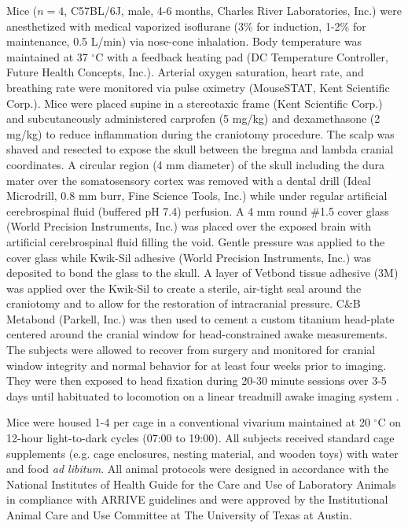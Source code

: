 \documentclass[review]{elsarticle}
\begin{document}
Mice ($n = 4$, C57BL/6J, male, 4-6 months, Charles River Laboratories, Inc.) were anesthetized with medical  vaporized isoflurane (3\% for induction, 1-2\% for maintenance, 0.5 L/min) via nose-cone inhalation. Body temperature was maintained at 37 $^\circ$C with a feedback heating pad (DC Temperature Controller, Future Health Concepts, Inc.). Arterial oxygen saturation, heart rate, and breathing rate were monitored via pulse oximetry (MouseSTAT, Kent Scientific Corp.). Mice were placed supine in a stereotaxic frame (Kent Scientific Corp.) and subcutaneously administered carprofen (5 mg/kg) and dexamethasone (2 mg/kg) to reduce inflammation during the craniotomy procedure. The scalp was shaved and resected to expose the skull between the bregma and lambda cranial coordinates. A circular region (4 mm diameter) of the skull including the dura mater over the somatosensory cortex was removed with a dental drill (Ideal Microdrill, 0.8 mm burr, Fine Science Tools, Inc.) while under regular artificial cerebrospinal fluid (buffered pH 7.4) perfusion. A 4 mm round \#1.5 cover glass (World Precision Instruments, Inc.) was placed over the exposed brain with artificial cerebrospinal fluid filling the void. Gentle pressure was applied to the cover glass while Kwik-Sil adhesive (World Precision Instruments, Inc.) was deposited to bond the glass to the skull. A layer of Vetbond tissue adhesive (3M) was applied over the Kwik-Sil to create a sterile, air-tight seal around the craniotomy and to allow for the restoration of intracranial pressure. C\&B Metabond (Parkell, Inc.) was then used to cement a custom titanium head-plate centered around the cranial window for head-constrained awake measurements. The subjects were allowed to recover from surgery and monitored for cranial window integrity and normal behavior for at least four weeks prior to imaging. They were then exposed to head fixation during 20-30 minute sessions over 3-5 days until habituated to locomotion on a linear treadmill awake imaging system \cite{He:2020}.

Mice were housed 1-4 per cage in a conventional vivarium maintained at 20 $^\circ$C on 12-hour light-to-dark cycles (07:00 to 19:00). All subjects received standard cage supplements (e.g. cage enclosures, nesting material, and wooden toys) with water and food \textit{ad libitum}. All animal protocols were designed in accordance with the National Institutes of Health Guide for the Care and Use of Laboratory Animals in compliance with ARRIVE guidelines and were approved by the Institutional Animal Care and Use Committee at The University of Texas at Austin.
\end{document}
